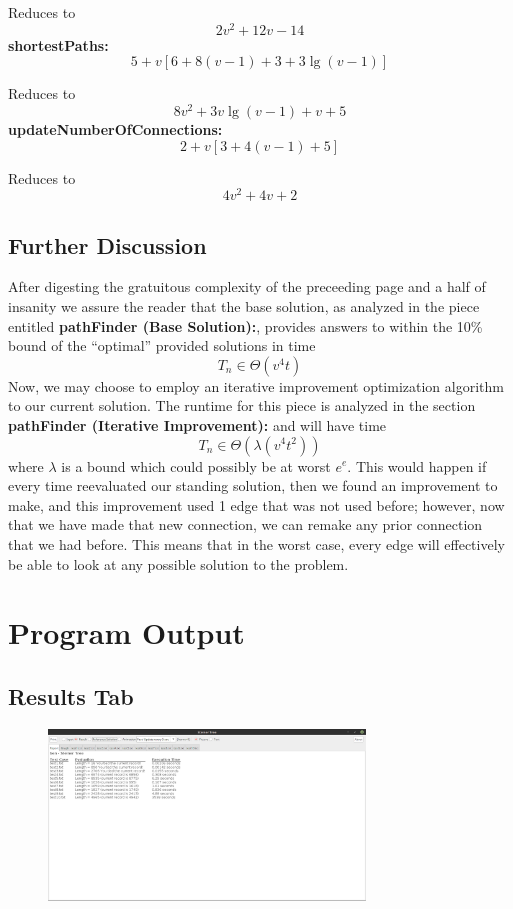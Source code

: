 \documentclass[12pt]{article}
\begin{document}
Reduces to
$$
2v^2 + 12v - 14
$$
\textbf{shortestPaths:}
\begin{dmath*}
5 + v
\left[
    6 + 8(v - 1) + 3 + 3\lg(v - 1)
\right]
\end{dmath*}

Reduces to
$$
8v^2 + 3v\lg(v - 1) + v + 5
$$
%
\textbf{updateNumberOfConnections:}
\begin{dmath*}
2 + v
\left[
3 + 4(v - 1) + 5
\right]
\end{dmath*}

Reduces to
$$
4v^2 + 4v + 2
$$

\subsection*{Further Discussion}

After digesting the gratuitous complexity of the preceeding page and a half of
insanity we assure the reader that the base solution, as analyzed in the 
piece entitled \textbf{pathFinder (Base Solution):}, provides answers to within
the 10\% bound of the ``optimal'' provided solutions in time 
$$
T_n \in \Theta(v^4t)
$$
Now, we may choose to employ an iterative improvement optimization algorithm to 
our current solution. The runtime for this piece is analyzed in the section
\textbf{pathFinder (Iterative Improvement):} and will have time
$$
T_n \in \Theta(\lambda(v^4t^2))
$$
where $\lambda$ is a bound which could possibly be at worst $e^e$. This would 
happen if every time reevaluated our standing solution, then we found an
improvement to make, and this improvement used 1 edge that was not used before;
however, now that we have made that new connection, we can remake any prior 
connection that we had before. This means that in the worst case, every edge
will effectively be able to look at any possible solution to the problem.

\section{Program Output}

\subsection*{Results Tab}

\begin{figure}[h]
    \centering
    \includegraphics[width=0.75\textwidth]{restab.png}
\end{figure}
\newpage
\end{document}
